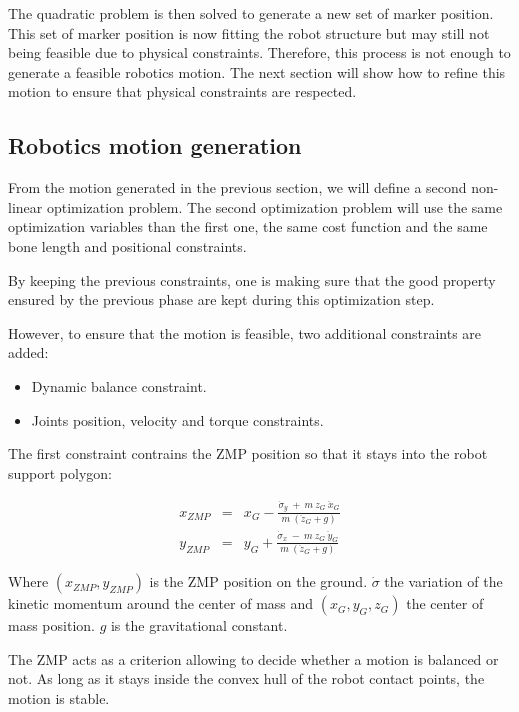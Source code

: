 \documentclass[letterpaper, 10 pt, conference]{ieeeconf}  %
\begin{document}
The quadratic problem is then solved to generate a new set of marker
position. This set of marker position is now fitting the robot
structure but may still not being feasible due to physical
constraints. Therefore, this process is not enough to generate a
feasible robotics motion. The next section will show how to refine
this motion to ensure that physical constraints are respected.


\subsection{Robotics motion generation}


From the motion generated in the previous section, we will define a
second non-linear optimization problem. The second optimization
problem will use the same optimization variables than the first one,
the same cost function and the same bone length and positional
constraints.


By keeping the previous constraints, one is making sure that the good
property ensured by the previous phase are kept during this
optimization step.


However, to ensure that the motion is feasible, two additional
constraints are added:
\begin{itemize}
\item Dynamic balance constraint.
\item Joints position, velocity and torque constraints.
\end{itemize}


The first constraint contrains the ZMP position so that it stays into
the robot support polygon:

\begin{equation}
  \begin{array}{ccc}
    x_{ZMP} &=& x_G - \frac{\dot{\sigma}_y\ +\ m\ z_G\ \ddot{x}_G}{m\ (\ddot{z}_G + g)} \\
    y_{ZMP} &=& y_G + \frac{\dot{\sigma}_x\ -\ m\ z_G\ \ddot{y}_G}{m\ (\ddot{z}_G + g)}
    \end{array}
\end{equation}

Where $(x_{ZMP}, y_{ZMP})$ is the ZMP position on the
ground. $\dot{\sigma}$ the variation of the kinetic momentum around
the center of mass and $(x_G, y_G, z_G)$ the center of mass position. $g$ is the gravitational constant.

The ZMP acts as a criterion allowing to decide whether a motion is
balanced or not. As long as it stays inside the convex hull of the
robot contact points, the motion is stable.
\end{document}
